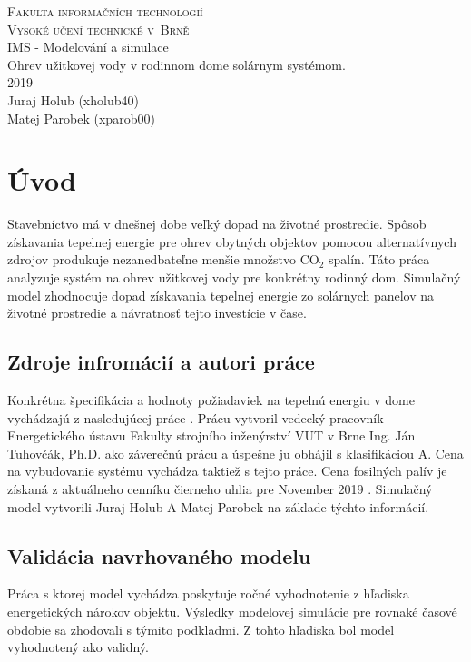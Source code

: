 \documentclass[a4paper, 11pt]{article}
\begin{document}
\begin{titlepage}
	\begin{center}
		\Huge
		\textsc{Fakulta informačních technologií \\
			Vysoké učení technické v~Brně} \\
		{\LARGE
			IMS - Modelování a simulace \\ 
			\medskip 
			\Large{
				Ohrev užitkovej vody v rodinnom dome solárnym systémom.
			}
			}
		\setlength{\parindent}{0.3em}\\
		{\Large 2019} \\
		{\Large Juraj Holub (xholub40)}\\
		{\Large Matej Parobek (xparob00)}
	\end{center}
\end{titlepage}

\tableofcontents
\newpage

\section{Úvod}
Stavebníctvo má v dnešnej dobe veľký dopad na životné prostredie. Spôsob získavania tepelnej energie pre ohrev obytných objektov pomocou alternatívnych zdrojov produkuje nezanedbateľne menšie množstvo CO$_2$ spalín. Táto práca analyzuje systém na ohrev užitkovej vody pre konkrétny rodinný dom. Simulačný model zhodnocuje dopad získavania tepelnej energie zo solárnych panelov na životné prostredie a návratnosť tejto investície v čase. 

\subsection{Zdroje infromácií a autori práce}
Konkrétna špecifikácia a hodnoty požiadaviek na tepelnú energiu v dome vychádzajú z nasledujúcej práce \cite{bc_solar_system}. Prácu vytvoril vedecký pracovník Energetického ústavu Fakulty strojního inženýrství VUT v Brne Ing. Ján Tuhovčák, Ph.D. ako záverečnú prácu a úspešne ju obhájil s klasifikáciou A. Cena na vybudovanie systému vychádza taktiež s tejto práce. Cena fosilných palív je získaná z aktuálneho cenníku čierneho uhlia pre November 2019 \cite{ceny_paliva}. Simulačný model vytvorili Juraj Holub A Matej Parobek na základe týchto informácií. 

\subsection{Validácia navrhovaného modelu}
Práca s ktorej model vychádza poskytuje ročné vyhodnotenie z hľadiska energetických nárokov objektu. Výsledky modelovej simulácie pre rovnaké časové obdobie sa zhodovali s týmito podkladmi. Z tohto hľadiska bol model vyhodnotený ako validný.
\end{document}
